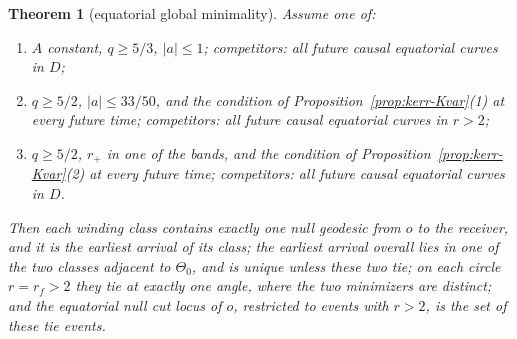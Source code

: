 \documentclass[aip,jmp,amsmath,amssymb,reprint]{revtex4-2}
\theoremstyle{plain}
\newtheorem{theorem}{Theorem}
\theoremstyle{definition}
\begin{document}
\begin{theorem}[equatorial global minimality]\label{thm:kerr-eq}
Assume one of:
\begin{enumerate}
\item[(i)] $A$ constant, $q\ge5/3$, $|a|\le1$; competitors: all future causal equatorial curves in $D$;
\item[(ii)] $q\ge5/2$, $|a|\le33/50$, and the condition of Proposition~\ref{prop:kerr-Kvar}(1) at every
  future time; competitors: all future causal equatorial curves in $r>2$;
\item[(iii)] $q\ge5/2$, $r_+$ in one of the bands, and the condition of
  Proposition~\ref{prop:kerr-Kvar}(2) at every future time; competitors: all future causal equatorial
  curves in $D$.
\end{enumerate}
Then each winding class contains exactly one null geodesic from $o$ to the receiver, and it is the
earliest arrival of its class; the earliest arrival overall lies in one of the two classes
adjacent to $\Theta_0$, and is unique unless these two tie; on each circle $r=r_f>2$ they tie at exactly
one angle, where the two minimizers are distinct; and the equatorial null cut locus of $o$,
restricted to events with $r>2$, is the set of these tie events.
\end{theorem}
\end{document}
